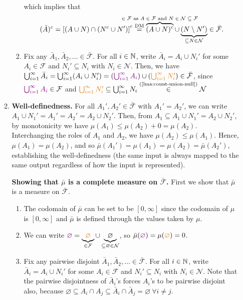 \begin{enumerate}
\begin{pf}
\begin{enumerate}
\begin{enumerate}[label={(\arabic*)}]
which implies that
\[
(\bar{A})^c=\left[(A\cup N)\cap(N^c\cup N')\right]^{c}
\overset{\text{DM}}{=}
\overbrace{(A\cup N)^{c}}^{
\mathclap{\text{\(\in\mathcal{F}\) as \(A\in\mathcal{F}\) and \(N\in\mathcal{N}\subseteq \mathcal{F}\)}}}
\cup \underbrace{(N\setminus N')}_{\subseteq N\in\mathcal{N}}
\in\bar{\mathcal{F}}.
\]
\item Fix any
\(\bar{A}_1,\bar{A}_2,\dotsc\in\bar{\mathcal{F}}\). For all
\(i\in\mathbb{N}\), write \(\bar{A}_i=A_i\cup N_i'\) for some
\(A_i\in\mathcal{F}\) and \(N_i'\subseteq N_i\) with \(N_i\in\mathcal{N}\).
Then, we have \(\bigcup_{i=1}^{\infty}\bar{A}_i
=\bigcup_{i=1}^{\infty}(A_i\cup N_i')
=(\vc{\bigcup_{i=1}^{\infty}A_i})\cup(\orc{\bigcup_{i=1}^{\infty}N_i'})\in\bar{\mathcal{F}}
\), since \(\vc{\bigcup_{i=1}^{\infty}A_i}\in\mathcal{F}\) and
\(\orc{\bigcup_{i=1}^{\infty}N_i'}\subseteq
\bigcup_{i=1}^{\infty}N_i\overset{\text{(\Cref{lma:count-union-null})}}{\in}\mathcal{N}\)
\end{enumerate}
\item \textbf{Well-definedness.} For all
\(A_1',A_2'\in\bar{\mathcal{F}}\) with \(A_1'=A_2'\), we can write
\(A_1\cup N_1'=A_1'=A_2'=A_2\cup N_2'\). Then, from \(A_1\subseteq A_1\cup
N_1'=A_2\cup N_2'\), by monotonicity we have
\(\mu(A_1)\le\mu(A_2)+0=\mu(A_2)\). Interchanging the roles of \(A_1\) and
\(A_2\), we have \(\mu(A_2)\le\mu(A_1)\). Hence, \(\mu(A_1)=\mu(A_2)\), and so
\(\bar{\mu}(A_1')=\mu(A_1)=\mu(A_2)=\bar{\mu}(A_2')\), establishing
the well-definedness (the same input is always mapped to the same output
regardless of how the input is represented).

\textbf{Showing that \(\bar{\mu}\) is a complete measure on \(\bar{\mathcal{F}}\).}
First we show that \(\bar{\mu}\) is a measure on \(\bar{\mathcal{F}}\).
\begin{enumerate}[label={(\arabic*)}]
\item The codomain of \(\bar{\mu}\) can be set to be \([0,\infty]\) since the
codomain of \(\mu\) is \([0,\infty]\) and \(\bar{\mu}\) is defined through
the values taken by \(\mu\).
\item  We can write
\(\vc{\varnothing}=\underbrace{\orc{\varnothing}}_{\in\mathcal{F}}\cup\underbrace{\varnothing}_{\subseteq
\varnothing\in\mathcal{N}}\), so
\(\bar{\mu}(\vc{\varnothing})=\mu(\orc{\varnothing})=0\).

\item Fix any pairwise disjoint
\(\bar{A}_1,\bar{A}_2,\dotsc\in\bar{\mathcal{F}}\). For all
\(i\in\mathbb{N}\), write \(\bar{A}_i=A_i\cup N_i'\) for some
\(A_i\in\mathcal{F}\) and \(N_i'\subseteq N_i\) with \(N_i\in\mathcal{N}\).
Note that the pairwise disjointness of \(\bar{A}_i\)'s forces \(A_i\)'s
to be pairwise disjoint also, because \(\varnothing\subseteq A_i\cap
A_j\subseteq \bar{A}_i\cap\bar{A}_j=\varnothing~\forall i\ne j\).


\end{enumerate}
\end{enumerate}
\end{pf}
\end{enumerate}
